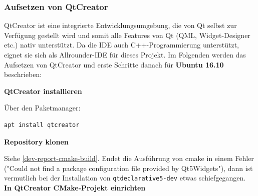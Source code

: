
\subsubsection{Aufsetzen von QtCreator}

QtCreator ist eine integrierte Entwicklungsumgebung, die von Qt selbst zur
Verfügung gestellt wird und somit alle Features von Qt (QML, Widget-Designer
etc.) nativ unterstützt. Da die IDE auch C++-Programmierung unterstützt, eignet
sie sich als Allrounder-IDE für dieses Projekt. Im Folgenden werden das
Aufsetzen von QtCreator und erste Schritte danach für \textbf{Ubuntu 16.10}
beschrieben:

\textbf{QtCreator installieren}

Über den Paketmanager:
\begin{lstlisting}
apt install qtcreator
\end{lstlisting}

\textbf{Repository klonen}

Siehe \autoref{dev-report-cmake-build}. Endet die Ausführung von cmake in einem
Fehler ("Could not find a package configuration file provided by Qt5Widgets"),
dann ist vermutlich bei der Installation von \texttt{qtdeclarative5-dev} etwas
schiefgegangen.\\

\textbf{In QtCreator CMake-Projekt einrichten}

